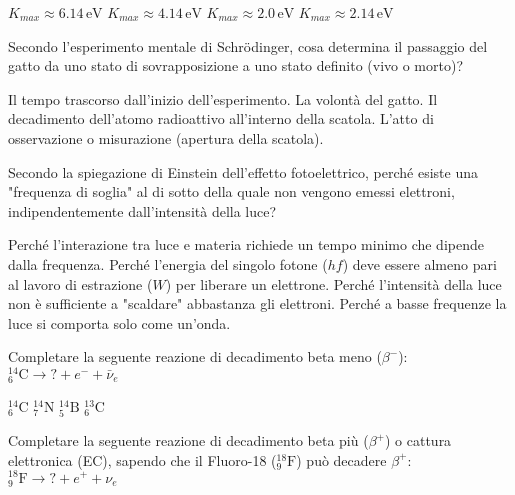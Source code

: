 \documentclass{exam}%
\begin{document}
\begin{questions}
\vspace{0.2em}%
\begin{multicols}{4}%
\begin{choices}%
\choice $K_{max} \approx 6.14 \, \text{eV}$%
\choice $K_{max} \approx 4.14 \, \text{eV}$%
\choice $K_{max} \approx 2.0 \, \text{eV}$%
\choice $K_{max} \approx 2.14 \, \text{eV}$%
\end{choices}%
\end{multicols}%
\question Secondo l'esperimento mentale di Schrödinger, cosa determina il passaggio del gatto da uno stato di sovrapposizione a uno stato definito (vivo o morto)?%
\vspace{0.2em}%
\begin{choices}%
\choice Il tempo trascorso dall'inizio dell'esperimento.%
\choice La volontà del gatto.%
\choice Il decadimento dell'atomo radioattivo all'interno della scatola.%
\choice L'atto di osservazione o misurazione (apertura della scatola).%
\end{choices}%
\question Secondo la spiegazione di Einstein dell'effetto fotoelettrico, perché esiste una "frequenza di soglia" al di sotto della quale non vengono emessi elettroni, indipendentemente dall'intensità della luce?%
\vspace{0.2em}%
\begin{choices}%
\choice Perché l'interazione tra luce e materia richiede un tempo minimo che dipende dalla frequenza.%
\choice Perché l'energia del singolo fotone ($hf$) deve essere almeno pari al lavoro di estrazione ($W$) per liberare un elettrone.%
\choice Perché l'intensità della luce non è sufficiente a "scaldare" abbastanza gli elettroni.%
\choice Perché a basse frequenze la luce si comporta solo come un'onda.%
\end{choices}%
\question Completare la seguente reazione di decadimento beta meno ($\beta^-$): $^{14}_{6}\text{C} \rightarrow ? + e^- + \bar{\nu}_e$%
\vspace{0.2em}%
\begin{multicols}{4}%
\begin{choices}%
\choice $^{14}_{6}\text{C}$%
\choice $^{14}_{7}\text{N}$%
\choice $^{14}_{5}\text{B}$%
\choice $^{13}_{6}\text{C}$%
\end{choices}%
\end{multicols}%
\question Completare la seguente reazione di decadimento beta più ($\beta^+$) o cattura elettronica (EC), sapendo che il Fluoro-18 ($^{18}_{9}\text{F}$) può decadere $\beta^+$: $^{18}_{9}\text{F} \rightarrow ? + e^+ + \nu_e$%
\vspace{0.2em}%

\end{questions}
\end{document}
